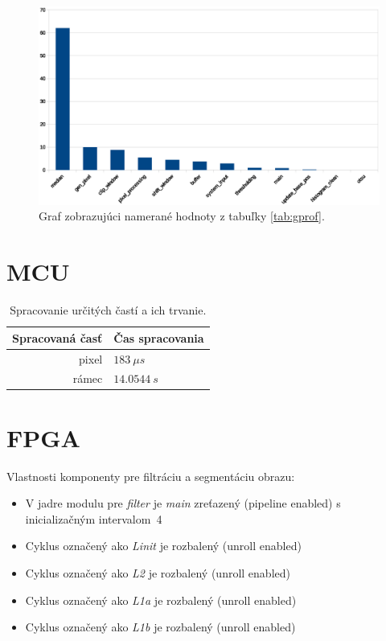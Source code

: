 \documentclass[11pt,a4paper]{article}
\begin{document}
\begin{figure}[H]
    \centering
    \includegraphics[scale=0.6]{graph.eps}
    \caption{Graf zobrazujúci namerané hodnoty z tabuľky \ref{tab:gprof}.}
    \label{fig:graf}
\end{figure}

\newpage
\section{MCU}

\begin{table}[H]
  \begin{center}
    \begin{tabular}{r|l}
        \multicolumn{1}{c|}{\textbf{Spracovaná časť}} & \multicolumn{1}{c}{\textbf{Čas spracovania}}\\
        \hline
        pixel & $183 \ \mu s$\\
        rámec & $14.0544 \ s$\\
    \end{tabular}
    \caption{Spracovanie určitých častí a ich trvanie.}
    \label{tab:process}
  \end{center}
\end{table}

\section{FPGA}

Vlastnosti komponenty pre filtráciu a segmentáciu obrazu:

\begin{itemize}
    \item V jadre modulu pre \textit{filter} je \textit{main} zreťazený (pipeline enabled) s inicializačným intervalom~4
    \item Cyklus označený ako \textit{Linit} je rozbalený (unroll enabled)
    \item Cyklus označený ako \textit{L2} je rozbalený (unroll enabled)
    \item Cyklus označený ako \textit{L1a} je rozbalený (unroll enabled)
    \item Cyklus označený ako \textit{L1b} je rozbalený (unroll enabled)
\end{itemize}
\end{document}
